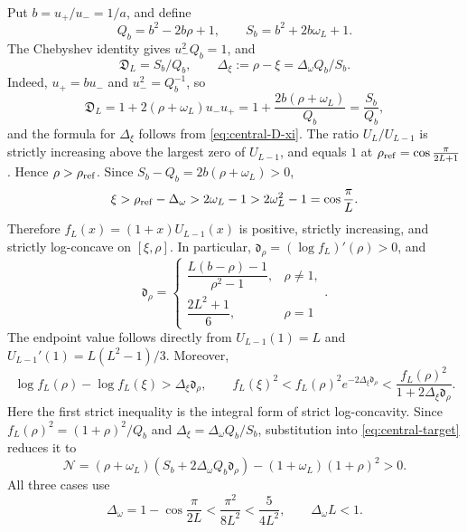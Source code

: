 \documentclass[12pt,anonymous]{iopjournal}
\numberwithin{equation}{section}
\theoremstyle{remark}
\begin{document}
Put \(b=u_+/u_-=1/a\), and define
\[
 Q_b=b^2-2b\rho+1,\qquad S_b=b^2+2b\omega_L+1.
\]
The Chebyshev identity gives \(u_-^2Q_b=1\), and
\begin{equation}\label{eq:central-D-QS}
 \mathfrak D_L=S_b/Q_b,\qquad
 \Delta_\xi:=\rho-\xi=\Delta_\omega Q_b/S_b.
\end{equation}
Indeed, \(u_+=bu_-\) and \(u_-^2=Q_b^{-1}\), so
\[
 \mathfrak D_L=1+2(\rho+\omega_L)u_-u_+
  =1+\frac{2b(\rho+\omega_L)}{Q_b}=\frac{S_b}{Q_b},
\]
and the formula for \(\Delta_\xi\) follows from
\eqref{eq:central-D-xi}.
The ratio \(U_L/U_{L-1}\) is strictly increasing above the largest zero
of \(U_{L-1}\), and equals \(1\) at
\(\rho_{\rm ref}=\cos\frac{\pi}{2L+1}\).  Hence
\(\rho>\rho_{\rm ref}\).  Since
\(S_b-Q_b=2b(\rho+\omega_L)>0\),
\[
 \xi>\rho_{\rm ref}-\Delta_\omega>2\omega_L-1
 >2\omega_L^2-1=\cos\frac{\pi}{L}.
\]
Therefore \(f_L(x)=(1+x)U_{L-1}(x)\) is positive, strictly increasing,
and strictly log-concave on \([\xi,\rho]\).  In particular,
\(\mathfrak d_\rho=(\log f_L)'(\rho)>0\), and
\[
 \mathfrak d_\rho=
 \begin{cases}
  \dfrac{L(b-\rho)-1}{\rho^2-1},&\rho\neq1,\\[6pt]
  \dfrac{2L^2+1}{6},&\rho=1
 \end{cases}.
\]
The endpoint value follows directly from \(U_{L-1}(1)=L\) and
\(U_{L-1}'(1)=L(L^2-1)/3\).  Moreover,
\[
 \log f_L(\rho)-\log f_L(\xi)>\Delta_\xi\mathfrak d_\rho,
 \qquad
 f_L(\xi)^2<f_L(\rho)^2e^{-2\Delta_\xi\mathfrak d_\rho}
 <\frac{f_L(\rho)^2}{1+2\Delta_\xi\mathfrak d_\rho}.
\]
Here the first strict inequality is the integral form of strict
log-concavity.  Since
\(f_L(\rho)^2=(1+\rho)^2/Q_b\) and
\(\Delta_\xi=\Delta_\omega Q_b/S_b\), substitution into
\eqref{eq:central-target} reduces it to
\begin{equation}\label{eq:N-positive-target}
 \mathcal N=(\rho+\omega_L)
 (S_b+2\Delta_\omega Q_b\mathfrak d_\rho)
 -(1+\omega_L)(1+\rho)^2>0.
\end{equation}
All three cases use
\begin{equation}\label{eq:Delta-omega-basic-bound}
 \Delta_\omega=1-\cos\frac{\pi}{2L}
 <\frac{\pi^2}{8L^2}<\frac5{4L^2},
 \qquad \Delta_\omega L<1.
\end{equation}
\end{document}
